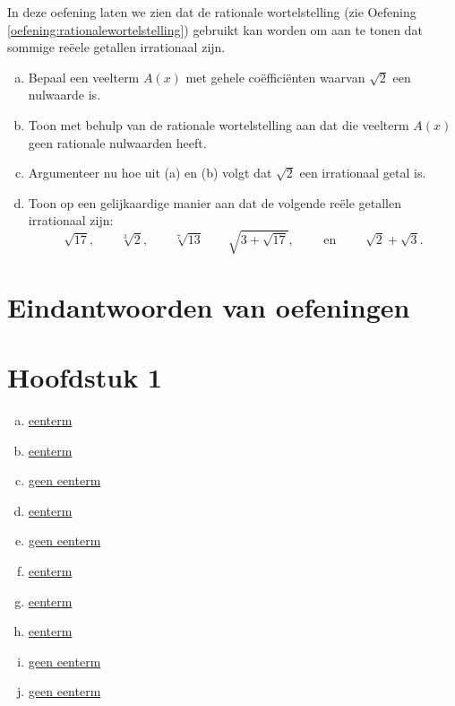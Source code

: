 \documentclass{ximera}
\begin{document}
\begin{Uitbreiding}
\begin{exercise} 
In deze oefening laten we zien dat de rationale wortelstelling (zie Oefening \ref{oefening:rationalewortelstelling}) gebruikt kan worden om aan te tonen dat sommige re\"eele getallen irrationaal zijn.
\begin{enumerate}[(a)]
\item
Bepaal een veelterm $A(x)$ met gehele co\"effici\"enten waarvan $\sqrt{2}$ een nulwaarde is.
\item
Toon met behulp van de rationale wortelstelling aan dat die veelterm $A(x)$ geen rationale nulwaarden heeft.
\item
Argumenteer nu hoe uit (a) en (b) volgt dat $\sqrt{2}$ een irrationaal getal is.
\item
Toon op een gelijkaardige manier aan dat de volgende re\"ele getallen irrationaal zijn:
\[
\sqrt{17}, \qquad \sqrt[3]{2}, \qquad \sqrt[7]{13} \qquad \sqrt{3+\sqrt{17}}, 
\qquad \text{ en } \qquad \sqrt{2}+\sqrt{3}.
\]
\end{enumerate}
\end{exercise} 
\end{Uitbreiding}
















\section{Eindantwoorden van oefeningen}













\section*{Hoofdstuk 1}

\begin{oplossing} 
\begin{enumerate}[(a)]
\item
\hyperlink{oef1.1}{eenterm}
\item
\hyperlink{oef1.1}{eenterm}
\item
\hyperlink{oef1.1}{geen eenterm}
\item
\hyperlink{oef1.1}{eenterm}
\item
\hyperlink{oef1.1}{geen eenterm}
\item
\hyperlink{oef1.1}{eenterm}
\item\hyperlink{oef1.1}{eenterm}
\item
\hyperlink{oef1.1}{eenterm}
\item
\hyperlink{oef1.1}{geen eenterm}
\item
\hyperlink{oef1.1}{geen eenterm}
\end{enumerate}
\end{oplossing} 
\end{document}
